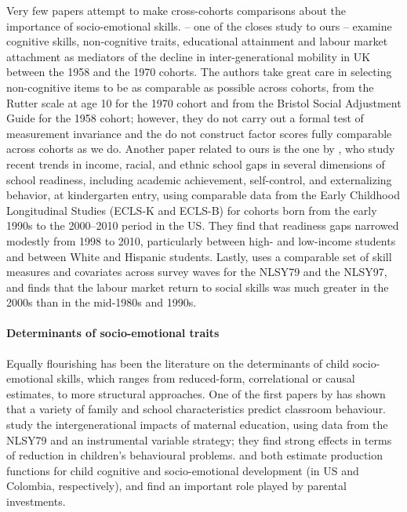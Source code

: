 Very few papers attempt to make cross-cohorts comparisons about the importance of socio-emotional skills. \citet{blanden2007accounting} -- one of the closes study to ours -- examine cognitive skills, non‐cognitive traits, educational attainment and labour market attachment as mediators of the decline in inter-generational mobility in UK between the 1958 and the 1970 cohorts. The authors take great care in selecting non-cognitive items to be as comparable as possible across cohorts, from the Rutter scale at age 10 for the 1970 cohort and from the Bristol Social Adjustment Guide for the 1958 cohort; however, they do not carry out a formal test of measurement invariance and the do not construct factor scores fully comparable across cohorts as we do. Another paper related to ours is the one by \citet{reardon2016recent}, who study recent trends in income, racial, and ethnic school gaps in several dimensions of school readiness, including academic achievement, self-control, and externalizing behavior, at
kindergarten entry, using comparable data from the Early Childhood Longitudinal Studies (ECLS-K and ECLS-B) for cohorts born from the
early 1990s to the 2000–2010 period in the US. They find that readiness gaps narrowed modestly from 1998 to 2010, particularly between high- and low-income students and between White and Hispanic students. Lastly, \citet{deming2017growing} uses a comparable set of skill measures and covariates across survey waves for the NLSY79 and the NLSY97, and finds that the labour market return to social skills was much greater in the 2000s than in the mid-1980s and 1990s.

\paragraph{Determinants of socio-emotional traits} Equally flourishing has been the literature on the determinants of child socio-emotional skills, which ranges from reduced-form, correlational or causal estimates, to more structural approaches. One of the first papers by \citet{segal2008classroom} has shown that a variety of family and school characteristics predict classroom behaviour. \citet{carneiro2013maternal} study the intergenerational impacts of maternal education, using data from the NLSY79 and an instrumental variable strategy; they find strong effects in terms of reduction in children's behavioural problems. \citet{cunha2010estimating} and \citet{attanasio2018estimating} both estimate production functions for child cognitive and socio-emotional development (in US and Colombia, respectively), and find an important role played by parental investments.


